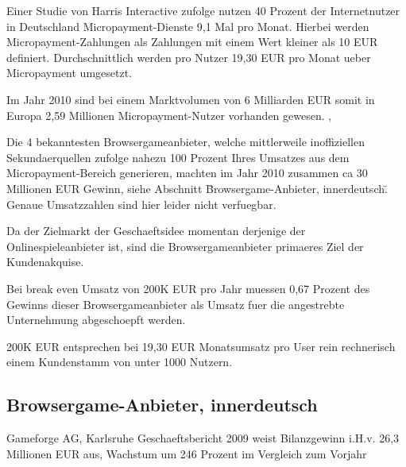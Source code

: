 Einer Studie von Harris Interactive zufolge \cite{da3} nutzen 40 Prozent der
Internetnutzer in Deutschland Micropayment-Dienste 9,1 Mal pro Monat. Hierbei werden
Micropayment-Zahlungen als Zahlungen mit einem Wert kleiner als 10 EUR
definiert. Durchschnittlich werden pro Nutzer 19,30 EUR pro Monat ueber
Micropayment umgesetzt. \newline 

Im Jahr 2010 sind bei einem Marktvolumen von 6 Milliarden EUR somit in Europa
2,59 Millionen Micropayment-Nutzer vorhanden gewesen. \cite{da2}, \cite{da3} \newline 

Die 4 bekanntesten Browsergameanbieter, welche mittlerweile inoffiziellen
Sekundaerquellen zufolge nahezu 100 Prozent Ihres Umsatzes aus dem
Micropayment-Bereich generieren, machten im Jahr 2010 zusammen ca 30 Millionen
EUR Gewinn, siehe Abschnitt \"Browsergame-Anbieter, innerdeutsch\". Genaue
Umsatzzahlen sind hier leider nicht verfuegbar. \newline

Da der Zielmarkt der Geschaeftsidee momentan derjenige der Onlinespieleanbieter
ist, sind die Browsergameanbieter primaeres Ziel der Kundenakquise. \newline

Bei break even Umsatz von 200K EUR pro Jahr muessen 0,67 Prozent des Gewinns
dieser Browsergameanbieter als Umsatz fuer die angestrebte Unternehmung
abgeschoepft werden.  \newline 

200K EUR entsprechen bei 19,30 EUR Monatsumsatz pro User rein rechnerisch einem
Kundenstamm von unter 1000 Nutzern. \newline 


\subsection{Browsergame-Anbieter, innerdeutsch}


Gameforge AG, Karlsruhe\newline \newline
Geschaeftsbericht 2009 weist Bilanzgewinn i.H.v. 26,3 Millionen EUR aus,
Wachstum um 246 Prozent im Vergleich zum Vorjahr \newline

